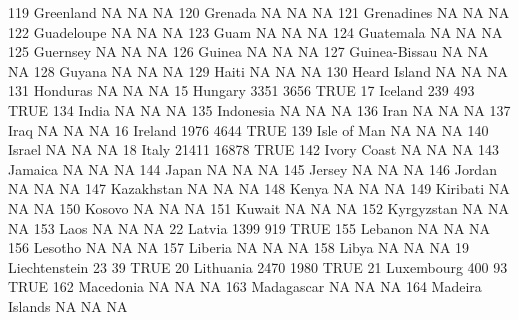 \documentclass [a4paper] {article}
\begin{document}
\begin{Schunk}
\begin{Soutput}
119                           Greenland    NA    NA   NA
120                             Grenada    NA    NA   NA
121                          Grenadines    NA    NA   NA
122                          Guadeloupe    NA    NA   NA
123                                Guam    NA    NA   NA
124                           Guatemala    NA    NA   NA
125                            Guernsey    NA    NA   NA
126                              Guinea    NA    NA   NA
127                       Guinea-Bissau    NA    NA   NA
128                              Guyana    NA    NA   NA
129                               Haiti    NA    NA   NA
130                        Heard Island    NA    NA   NA
131                            Honduras    NA    NA   NA
15                              Hungary  3351  3656 TRUE
17                              Iceland   239   493 TRUE
134                               India    NA    NA   NA
135                           Indonesia    NA    NA   NA
136                                Iran    NA    NA   NA
137                                Iraq    NA    NA   NA
16                              Ireland  1976  4644 TRUE
139                         Isle of Man    NA    NA   NA
140                              Israel    NA    NA   NA
18                                Italy 21411 16878 TRUE
142                         Ivory Coast    NA    NA   NA
143                             Jamaica    NA    NA   NA
144                               Japan    NA    NA   NA
145                              Jersey    NA    NA   NA
146                              Jordan    NA    NA   NA
147                          Kazakhstan    NA    NA   NA
148                               Kenya    NA    NA   NA
149                            Kiribati    NA    NA   NA
150                              Kosovo    NA    NA   NA
151                              Kuwait    NA    NA   NA
152                          Kyrgyzstan    NA    NA   NA
153                                Laos    NA    NA   NA
22                               Latvia  1399   919 TRUE
155                             Lebanon    NA    NA   NA
156                             Lesotho    NA    NA   NA
157                             Liberia    NA    NA   NA
158                               Libya    NA    NA   NA
19                        Liechtenstein    23    39 TRUE
20                            Lithuania  2470  1980 TRUE
21                           Luxembourg   400    93 TRUE
162                           Macedonia    NA    NA   NA
163                          Madagascar    NA    NA   NA
164                     Madeira Islands    NA    NA   NA

\end{Soutput}
\end{Schunk}
\end{document}
